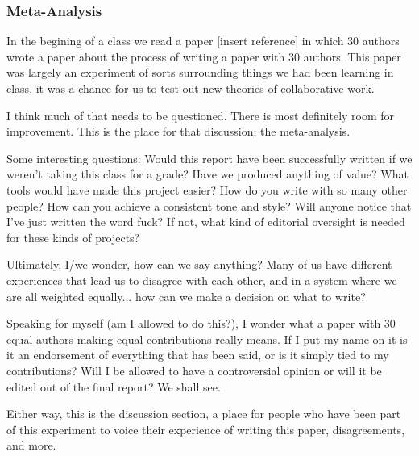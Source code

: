 \subsubsection{Meta-Analysis}
In the begining of a class we read a paper [insert reference] in which 30 authors wrote a paper
about the process of writing a paper with 30 authors. This paper was largely an experiment of sorts
surrounding things we had been learning in class, it was a chance for us to test out new theories 
of collaborative work.

I think much of that needs to be questioned. There is most definitely room for improvement. This
is the place for that discussion; the meta-analysis.

Some interesting questions:
Would this report have been successfully written if we weren't taking this class for a grade?
Have we produced anything of value?
What tools would have made this project easier? 
How do you write with so many other people? How can you achieve a consistent tone and style? 
Will anyone notice that I've just written the word fuck? If not, what kind of editorial oversight is needed for these kinds of projects?

Ultimately, I/we wonder, how can we say anything? Many of us have different experiences that lead us to disagree with each other, and in a system where we are all weighted equally... how can we make a decision on what to write?

Speaking for myself (am I allowed to do this?), I wonder what a paper with 30 equal authors making equal contributions really means. If I put my name on it is it an endorsement of everything that has been said, or is it simply tied to my contributions? Will I be allowed to have a controversial opinion or will it be edited out of the final report? We shall see.

Either way, this is the discussion section, a place for people who have been part of this experiment to voice their experience of writing this paper, disagreements, and more. 




